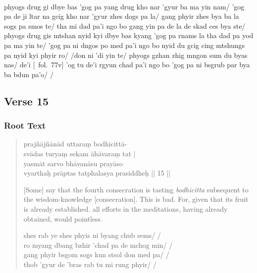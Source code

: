 \documentclass[12pt]{article}
\begin{document}
\textbf{\TVB}\\
phyogs drug gi dbye bas 'gog pa yang drug kho nar 'gyur ba ma yin nam/ 'gog pa de ji ltar na gcig kho nar 'gyur zhes dogs pa la/ gang phyir zhes bya ba la sogs pa smos te/ tha mi dad pa'i ngo bo gang yin pa de la de skad ces bya ste/ phyogs drug gis mtshan nyid kyi dbye bas kyang 'gog pa rnams la tha dad pa yod pa ma yin te/ 'gog pa ni dngos po med pa'i ngo bo nyid du gcig cing mtshungs pa nyid kyi phyir ro/ /don ni 'di yin te/ phyogs gzhan zhig mngon sum du byas nas/ de'i [\TVB\ fol.\ 77v] 'og tu de'i rgyun chad pa'i ngo bo 'gog pa ni bsgrub par bya ba bdun pa'o/ /

\subsection{Verse 15}
\subsubsection{Root Text}
\begin{quote}
	prajñājñānād uttaraṃ bodhicittā-\\
	svādas turyaṃ sekam\footnoteB{
		sekam] \EDD ; seṣam \MS
	} āhāvaraṃ tat |\\
	yasmāt\footnoteB{
		yasmāt] \EDD ; paścāt \MS
	} sarvo bhāvanāsu prayāso \\
	vyarthaḥ prāptas tatphalasya prasiddheḥ || 15 ||

	[Some] say that the fourth consecration is tasting \emph{bodhicitta} subsequent to the wisdom-knowledge [consecration]. This is bad. For, given that its fruit is already established. all efforts in the meditations, having already obtained, would pointless. 

	shes rab ye shes phyis ni byang chub sems/ /\\
	ro myang dbang bzhir 'chad pa de mchog min/ /\\
	gang phyir bsgom sogs kun stsol don med pa/ /\\
	thob 'gyur de 'bras rab tu mi rung phyir/ /
\end{quote}
\end{document}
